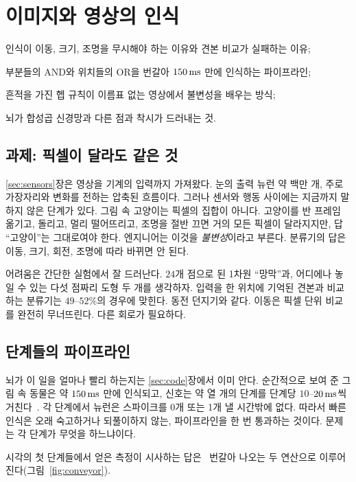 \chapter{이미지와 영상의 인식}
\label{sec:recognition}
\begin{chaptergoals}
\item 인식이 이동, 크기, 조명을 무시해야 하는 이유와 견본 비교가 실패하는 이유;
\item 부분들의 AND와 위치들의 OR을 번갈아 $150\,\text{ms}$ 만에 인식하는 파이프라인;
\item 흔적을 가진 헵 규칙이 이름표 없는 영상에서 불변성을 배우는 방식;
\item 뇌가 합성곱 신경망과 다른 점과 착시가 드러내는 것.
\end{chaptergoals}

\section{과제: 픽셀이 달라도 같은 것}

\ref{sec:sensors}장은 영상을 기계의 입력까지 가져왔다. 눈의 출력 뉴런 약 백만 개, 주로 가장자리와 변화를 전하는 압축된 흐름이다. 그러나 센서와 행동 사이에는 지금까지 말하지 않은 단계가 있다. 그림 속 고양이는 픽셀의 집합이 아니다. 고양이를 반 프레임 옮기고, 돌리고, 멀리 떨어뜨리고, 조명을 절반 끄면 거의 모든 픽셀이 달라지지만, 답 “고양이”는 그대로여야 한다. 엔지니어는 이것을 \emph{불변성}이라고 부른다. 분류기의 답은 이동, 크기, 회전, 조명에 따라 바뀌면 안 된다.

어려움은 간단한 실험에서 잘 드러난다. $24$개 점으로 된 1차원 “망막”과, 어디에나 놓일 수 있는 다섯 점짜리 도형 두 개를 생각하자. 입력을 한 위치에 기억된 견본과 비교하는 분류기는 $49$--$52\%$의 경우에 맞힌다. 동전 던지기와 같다. 이동은 픽셀 단위 비교를 완전히 무너뜨린다. 다른 회로가 필요하다.

\section{단계들의 파이프라인}

뇌가 이 일을 얼마나 빨리 하는지는 \ref{sec:code}장에서 이미 안다. 순간적으로 보여 준 그림 속 동물은 약 $150\,\text{ms}$ 만에 인식되고, 신호는 약 열 개의 단계를 단계당 $10$--$20\,\text{ms}$씩 거친다~\cite{Thorpe1996}. 각 단계에서 뉴런은 스파이크를 0개 또는 1개 낼 시간밖에 없다. 따라서 빠른 인식은 오래 숙고하거나 되풀이하지 않는, 파이프라인을 한 번 통과하는 것이다. 문제는 각 단계가 무엇을 하느냐이다.

시각의 첫 단계들에서 얻은 측정이 시사하는 답은~\cite{HubelWiesel1962} 번갈아 나오는 두 연산으로 이루어진다(그림~\ref{fig:conveyor}).

